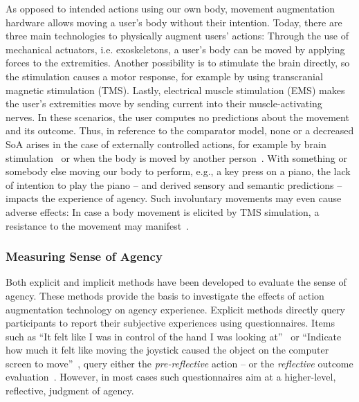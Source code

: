 As opposed to intended actions using our own body, movement augmentation hardware allows moving a user's body without their intention. Today, there are three main technologies to physically augment users' actions: Through the use of mechanical actuators, i.e. exoskeletons, a user's body can be moved by applying forces to the extremities. Another possibility is to stimulate the brain directly, so the stimulation causes a motor response, for example by using transcranial magnetic stimulation (TMS). Lastly, electrical muscle stimulation (EMS) makes the user's extremities move by sending current into their muscle-activating nerves. In these scenarios, the user computes no predictions about the movement and its outcome. Thus, in reference to the comparator model, none or a decreased SoA arises in the case of externally controlled actions, for example by brain stimulation~\cite{Haggard2002-sz} or when the body is moved by another person~\cite{Kuhn2013-ls}. With something or somebody else moving our body to perform, e.g., a key press on a piano, the lack of intention to play the piano -- and derived sensory and semantic predictions -- impacts the experience of agency. Such involuntary movements may even cause adverse effects: In case a body movement is elicited by TMS simulation, a resistance to the movement may manifest~\cite{Haggard2002-sz}.

\subsubsection{Measuring Sense of Agency}
Both explicit and implicit methods have been developed to evaluate the sense of agency. These methods provide the basis to investigate the effects of action augmentation technology on agency experience. Explicit methods directly query participants to report their subjective experiences using questionnaires. Items such as ``It felt like I was in control of the hand I was looking at''~\cite{Haggard2002-sz} or ``Indicate how much it felt like moving the joystick caused the object on the computer screen to move''~\cite{Ebert2010-lu}, query either the \textit{pre-reflective} action -- or the \textit{reflective} outcome evaluation~\cite{Moore2012-dk}. However, in most cases such questionnaires aim at a higher-level, reflective, judgment of agency. 

